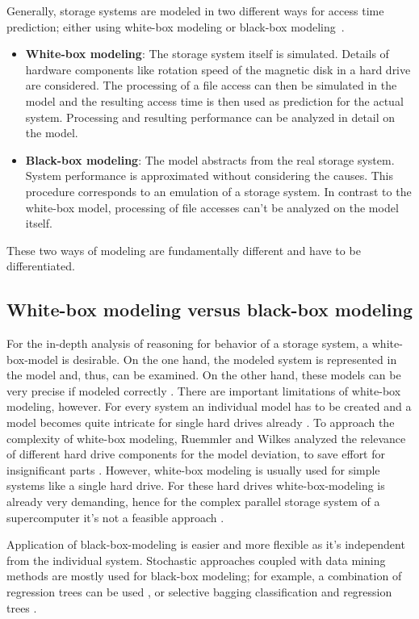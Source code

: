 \documentclass{superfri}
\begin{document}
	Generally, storage systems are modeled in two different ways for access time prediction; either using white-box modeling or black-box modeling~\cite{Crume:2013:FML:2538542.2538561}.
	\begin{itemize}
		\item \textbf{White-box modeling}: The storage system itself is simulated. 
		Details of hardware components like rotation speed of the magnetic disk in a hard drive are considered. 
		The processing of a file access can then be simulated in the model and the resulting access time is then used as prediction for the actual system.
		Processing and resulting performance can be analyzed in detail on the model.
		\item \textbf{Black-box modeling}: The model abstracts from the real storage system. 
		System performance is approximated without considering the causes. %
		This procedure corresponds to an emulation of a storage system.
		In contrast to the white-box model, processing of file accesses can't be analyzed on the model itself.
	\end{itemize}
	These two ways of modeling are fundamentally different and have to be differentiated.
	
	\subsection{White-box modeling versus black-box modeling}
	For the in-depth analysis of reasoning for behavior of a storage system, a white-box-model is desirable.
	On the one hand, the modeled system is represented in the model and, thus, can be examined. 
	On the other hand, these models can be very precise if modeled correctly \cite{Ruemmler94anintroduction}.
	There are important limitations of white-box modeling, however. 
	For every system an individual model has to be created and a model becomes quite intricate for single hard drives already \cite{Crume:2013:FML:2538542.2538561}.
	To approach the complexity of white-box modeling, Ruemmler and Wilkes analyzed the relevance of different hard drive components for the model deviation, to save effort for insignificant parts \cite{Ruemmler94anintroduction}.
	However, white-box modeling is usually used for simple systems like a single hard drive. For these hard drives white-box-modeling is already very demanding, hence for the complex parallel storage system of a supercomputer it's not a feasible approach \cite{DBLP:conf/npc/ZhangLZJC10}.
	
	Application of black-box-modeling is easier and more flexible as it's independent from the individual system.
	Stochastic approaches coupled with data mining methods are mostly used for black-box modeling; for example, a combination of regression trees can be used \cite{Dai:2012:SDP:2477169.2477214}, or selective bagging classification and regression trees \cite{DBLP:conf/npc/ZhangLZJC10}.
	
\end{document}
